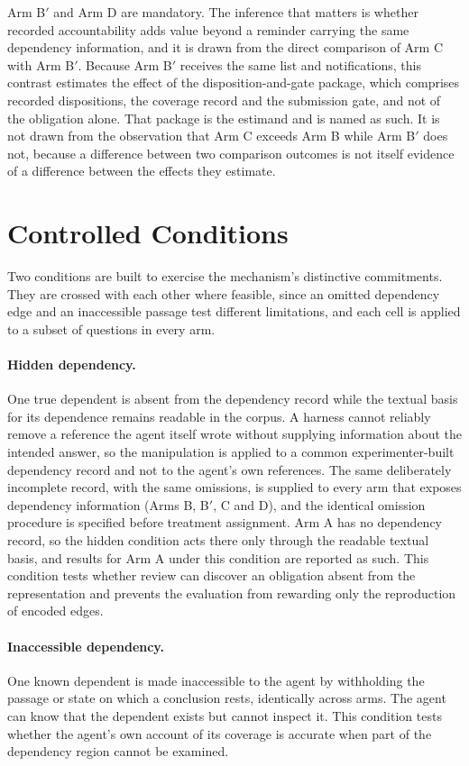 \documentclass[11pt]{article}
\begin{document}
Arm B$'$ and Arm D are mandatory. The inference that matters is whether recorded accountability adds value beyond a reminder carrying the same dependency information, and it is drawn from the direct comparison of Arm C with Arm B$'$. Because Arm B$'$ receives the same list and notifications, this contrast estimates the effect of the disposition-and-gate package, which comprises recorded dispositions, the coverage record and the submission gate, and not of the obligation alone. That package is the estimand and is named as such. It is not drawn from the observation that Arm C exceeds Arm B while Arm B$'$ does not, because a difference between two comparison outcomes is not itself evidence of a difference between the effects they estimate.

\section{Controlled Conditions}\label{sec:conditions}

Two conditions are built to exercise the mechanism's distinctive commitments. They are crossed with each other where feasible, since an omitted dependency edge and an inaccessible passage test different limitations, and each cell is applied to a subset of questions in every arm.

\paragraph{Hidden dependency.} One true dependent is absent from the dependency record while the textual basis for its dependence remains readable in the corpus. A harness cannot reliably remove a reference the agent itself wrote without supplying information about the intended answer, so the manipulation is applied to a common experimenter-built dependency record and not to the agent's own references. The same deliberately incomplete record, with the same omissions, is supplied to every arm that exposes dependency information (Arms B, B$'$, C and D), and the identical omission procedure is specified before treatment assignment. Arm A has no dependency record, so the hidden condition acts there only through the readable textual basis, and results for Arm A under this condition are reported as such. This condition tests whether review can discover an obligation absent from the representation and prevents the evaluation from rewarding only the reproduction of encoded edges.

\paragraph{Inaccessible dependency.} One known dependent is made inaccessible to the agent by withholding the passage or state on which a conclusion rests, identically across arms. The agent can know that the dependent exists but cannot inspect it. This condition tests whether the agent's own account of its coverage is accurate when part of the dependency region cannot be examined.
\end{document}
